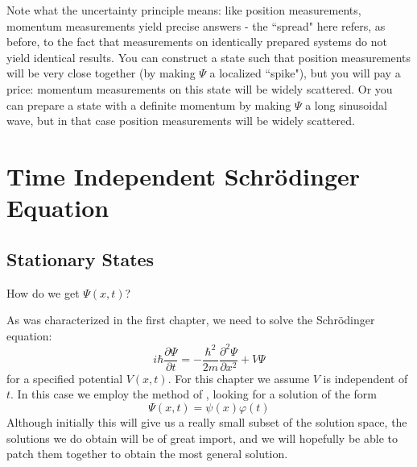 \documentclass[12pt, a4paper, oneside, openright, titlepage]{book}
\begin{document}
Note what the uncertainty principle means: like position measurements, momentum measurements yield precise answers - the ``spread" here refers, as before, to the fact that measurements on identically prepared systems do not yield identical results. You can construct a state such that position measurements will be very close together (by making $\Psi$ a localized ``spike"), but you will pay a price: momentum measurements on this state will be widely scattered. Or you can prepare a state with a definite momentum by making $\Psi$ a long sinusoidal wave, but in that case position measurements will be widely scattered.


\chapter{Time Independent Schr\"{o}dinger Equation}


\section{Stationary States}

\begin{qst}
    How do we get $\Psi(x,t)$?
\end{qst}

As was characterized in the first chapter, we need to solve the Schr\"{o}dinger equation: $$i\hbar\frac{\partial \Psi}{\partial t} = -\frac{\hbar^2}{2m}\frac{\partial^2\Psi}{\partial x^2} + V\Psi$$
for a specified potential $V(x,t)$. For this chapter we assume $V$ is independent of $t$. In this case we employ the method of , looking for a solution of the form $$\Psi(x,t) = \psi(x)\varphi(t)$$
Although initially this will give us a really small subset of the solution space, the solutions we do obtain will be of great import, and we will hopefully be able to patch them together to obtain the most general solution.
\end{document}
